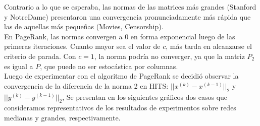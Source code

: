 \documentclass[a4paper]{article}
\begin{document}
Contrario a lo que se esperaba, las normas de las matrices más grandes (Stanford y NotreDame) presentaron una convergencia pronunciadamente más rápida que las de aquellas más pequeñas (Movies, Censorship).\\

En PageRank, las normas convergen a 0 en forma exponencial luego de las primeras iteraciones. Cuanto mayor sea el valor de $c$, más tarda en alcanzarse el criterio de parada. Con $c=1$, la norma podría no converger, ya que la matriz $P_2$ es igual a $P$, que puede no ser estocástica por columnas. \\ %

Luego de experimentar con el algoritmo de PageRank se decidió observar la convergencia de la diferencia de la norma 2 en HITS: $||x^{(k)}-x^{(k-1)}||_2$ y $||y^{(k)}-y^{(k-1)}||_2$, \newline
Se presentan en los siguientes gráficos dos casos que consideramos representativos de los resultados de experimentos sobre redes medianas y grandes, respectivamente. \newline
\end{document}
